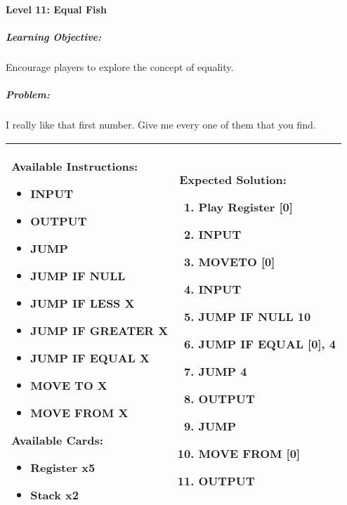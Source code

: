 \paragraph{Level 11: Equal Fish}
\subparagraph{Learning Objective:} Encourage players to explore the concept of equality.

\subparagraph{Problem:} I really like that first number. Give me every one of them that you find.

\begin{center}
    \begin{tabular}{ | m{5cm} | m{9cm} | } 
        \hline
            \textbf{Available Instructions:} 
            \begin{itemize}
                \setlength\itemsep{-.35em}
                \item INPUT
                \item OUTPUT
                \item JUMP
                \item JUMP IF NULL
                \item JUMP IF LESS X
                \item JUMP IF GREATER X
		\item JUMP IF EQUAL X
                \item MOVE TO X
                \item MOVE FROM X
            \end{itemize}
            \textbf{Available Cards:} 
            \begin{itemize}
                \setlength\itemsep{-.35em}
                \item Register x5
                \item Stack x2
            \end{itemize}& 
            \textbf{Expected Solution:} 
            \begin{enumerate}
                \setlength\itemsep{-.35em}
                \item Play Register [0]
                \item INPUT
                \item MOVETO [0]
                \item INPUT
                \item JUMP IF NULL 10
                \item JUMP IF EQUAL [0], 4
                \item JUMP 4
                \item OUTPUT
		\item JUMP 
                \item MOVE FROM [0]
                \item OUTPUT
            \end{enumerate}
            \\
        \hline
    \end{tabular}
\end{center}


